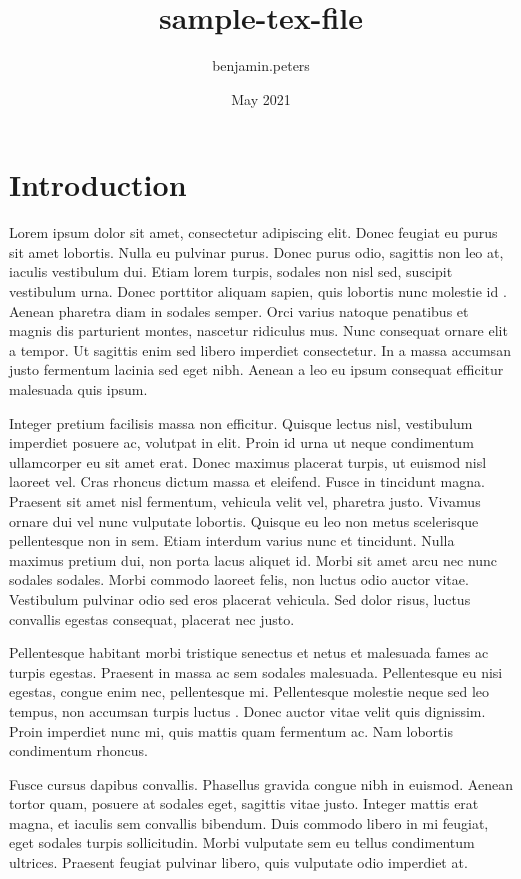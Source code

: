 \documentclass{article}
\title{sample-tex-file}
\author{benjamin.peters}
\date{May 2021}
\begin{document}
\maketitle

\section{Introduction}
Lorem ipsum dolor sit amet, consectetur adipiscing elit. Donec feugiat eu purus sit amet lobortis. Nulla eu pulvinar purus. Donec purus odio, sagittis non leo at, iaculis vestibulum dui. Etiam lorem turpis, sodales non nisl sed, suscipit vestibulum urna. Donec porttitor aliquam sapien, quis lobortis nunc molestie id \autocite{laemmli_1970_cleavage}. Aenean pharetra diam in sodales semper. Orci varius natoque penatibus et magnis dis parturient montes, nascetur ridiculus mus. Nunc consequat ornare elit a tempor. Ut sagittis enim sed libero imperdiet consectetur. In a massa accumsan justo fermentum lacinia sed eget nibh. Aenean a leo eu ipsum consequat efficitur malesuada quis ipsum.

Integer pretium facilisis massa non efficitur. Quisque lectus nisl, vestibulum imperdiet posuere ac, volutpat in elit. Proin id urna ut neque condimentum ullamcorper eu sit amet erat. Donec maximus placerat turpis, ut euismod nisl laoreet vel. Cras rhoncus dictum massa et eleifend. Fusce in tincidunt magna. Praesent sit amet nisl fermentum, vehicula velit vel, pharetra justo. Vivamus ornare dui vel nunc vulputate lobortis. Quisque eu leo non metus scelerisque pellentesque non in sem. Etiam interdum varius nunc et tincidunt. Nulla maximus pretium dui, non porta lacus aliquet id. Morbi sit amet arcu nec nunc sodales sodales. Morbi commodo laoreet felis, non luctus odio auctor vitae. Vestibulum pulvinar odio sed eros placerat vehicula. Sed dolor risus, luctus convallis egestas consequat, placerat nec justo.

Pellentesque habitant morbi tristique senectus et netus et malesuada fames ac turpis egestas. Praesent in massa ac sem sodales malesuada. Pellentesque eu nisi egestas, congue enim nec, pellentesque mi. Pellentesque molestie neque sed leo tempus, non accumsan turpis luctus \autocite{laemmli_1970_cleavage}. Donec auctor vitae velit quis dignissim. Proin imperdiet nunc mi, quis mattis quam fermentum ac. Nam lobortis condimentum rhoncus.

Fusce cursus dapibus convallis. Phasellus gravida congue nibh in euismod. Aenean tortor quam, posuere at sodales eget, sagittis vitae justo. Integer mattis erat magna, et iaculis sem convallis bibendum. Duis commodo libero in mi feugiat, eget sodales turpis sollicitudin. Morbi vulputate sem eu tellus condimentum ultrices. Praesent feugiat pulvinar libero, quis vulputate odio imperdiet at.
\end{document}
